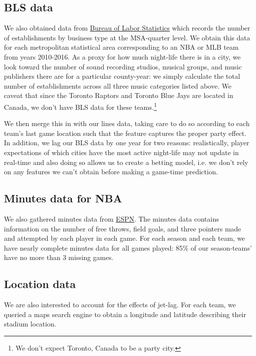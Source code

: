 \documentclass[letterpaper,12pt]{article}
\begin{document}
\subsection{BLS data} We also obtained data from
\href{https://www.bls.gov/data/}{Bureau of Labor Statistics} which records the number of establishments by business type at the MSA-quarter level. We obtain this data for each metropolitan statistical area corresponding
to an NBA or MLB team from years 2010-2016. 
As a proxy for how much night-life there is in a city, we look toward the 
number of sound recording studios, musical groups, and music publishers there 
are for a particular county-year: we simply calculate the total number of establishments across all three music categories listed above. We caveat that since the Toronto Raptors and Toronto Blue Jays are located in Canada, 
we don't have BLS data for these teams.\footnote{We don't expect Toronto, Canada to be a party city.}

We then merge this in with our lines data, taking care to do so according to each team's last game location such that the feature captures the proper
party effect. In addition, we lag our BLS data by one year for two reasons:
realistically, player expectations of which cities have the most active night-life may not
update in real-time and also doing so allows us to create a betting model, i.e.
we don't rely on any features we can't obtain before making a game-time prediction. 

\subsection{Minutes data for NBA}
We also gathered minutes data from \href{http://www.espn.com/nba/scoreboard/_/date/}{ESPN}.
The minutes data contains information on the number of free throws, field goals, and three pointers made and attempted by each player in each game.
For each season and each team, we have nearly complete 
minutes data for all games played: 85\% of our season-teams' have no more than 3 missing games.

\subsection{Location data} We are also interested
to account for the effects of jet-lag. For each team, we queried
a maps search engine to obtain a longitude and latitude describing their
stadium location.\citep{ggmap}
\end{document}
